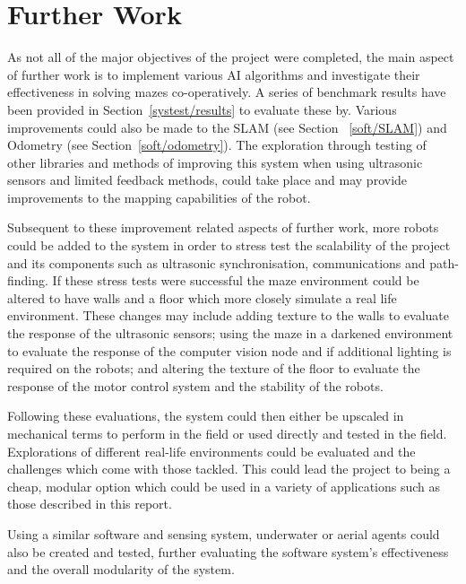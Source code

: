 
\chapter{Further Work}\label{furtherwork}
As not all of the major objectives of the project were completed, the main 
aspect of further work is to implement various AI algorithms and investigate 
their effectiveness in solving mazes co-operatively. A series of benchmark 
results have been provided in Section~\ref{systest/results} to evaluate 
these by. Various improvements could also be made to the SLAM (see Section~
\ref{soft/SLAM}) and Odometry (see Section~\ref{soft/odometry}). The exploration through testing of other 
libraries and methods of improving this system when using ultrasonic sensors 
and limited feedback methods, could take place and may provide improvements 
to the mapping capabilities of the robot. 

Subsequent to these improvement related aspects of further work, more robots 
could be added to the system in order to stress test the scalability of the 
project and its components such as ultrasonic synchronisation, 
communications and path-finding. If these stress tests were successful the 
maze environment could be altered to have walls and a floor which more 
closely simulate a real life environment. These changes may include adding 
texture to the walls to evaluate the response of the ultrasonic sensors; 
using the maze in a darkened environment to evaluate the response of the 
computer vision node and if additional lighting is required on the robots; 
and altering the texture of the floor to evaluate the response of the motor 
control system and the stability of the robots. 

Following these evaluations, the system could then either be upscaled in 
mechanical terms to perform in the field or used directly and tested in the 
field. Explorations of different real-life environments could be evaluated 
and the challenges which come with those tackled. This could lead the 
project to being a cheap, modular option which could be used in a variety of 
applications such as those described in this report. 

Using a similar software and sensing system, underwater or aerial agents 
could also be created and tested, further evaluating the software system's 
effectiveness and the overall modularity of the system. 